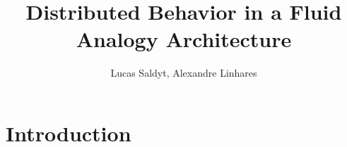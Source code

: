 \documentclass[a4paper]{article}
\title{Distributed Behavior in a Fluid Analogy Architecture}
\author{Lucas Saldyt, Alexandre Linhares}
\begin{document}
\maketitle

\begin{abstract}
\end{abstract}

\section{Introduction}

\end{document}
